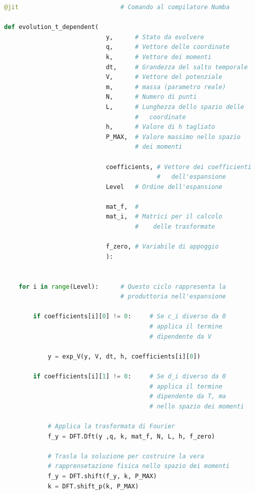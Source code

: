 \documentclass[12pt]{report}
\begin{document}
\begin{lstlisting}[language = Python]
@jit                            # Comando al compilatore Numba

def evolution_t_dependent(  
                            y,      # Stato da evolvere
                            q,      # Vettore delle coordinate
                            k,      # Vettore dei momenti
                            dt,     # Grandezza del salto temporale
                            V,      # Vettore del potenziale
                            m,      # massa (parametro reale)
                            N,      # Numero di punti
                            L,      # Lunghezza dello spazio delle 
                                    #   coordinate
                            h,      # Valore di h tagliato
                            P_MAX,  # Valore massimo nello spazio 
                                    # dei momenti  
                            
                            coefficients, # Vettore dei coefficienti 
                                          #   dell'espansione
                            Level   # Ordine dell'espansione

                            mat_f,  #
                            mat_i,  # Matrici per il calcolo
                                    #    delle trasformate

                            f_zero, # Variabile di appoggio
                            ):         
    
    
    for i in range(Level):      # Questo ciclo rappresenta la
                                # produttoria nell'espansione
        
        if coefficients[i][0] != 0:     # Se c_i diverso da 0
                                        # applica il termine 
                                        # dipendente da V

            y = exp_V(y, V, dt, h, coefficients[i][0])
    
        if coefficients[i][1] != 0:     # Se d_i diverso da 0
                                        # applica il termine 
                                        # dipendente da T, ma 
                                        # nello spazio dei momenti
            
            # Applica la trasformata di Fourier
            f_y = DFT.Dft(y ,q, k, mat_f, N, L, h, f_zero)   

            # Trasla la soluzione per costruire la vera
            # rapprensetazione fisica nello spazio dei momenti
            f_y = DFT.shift(f_y, k, P_MAX)
            k = DFT.shift_p(k, P_MAX)


\end{lstlisting}
\end{document}
